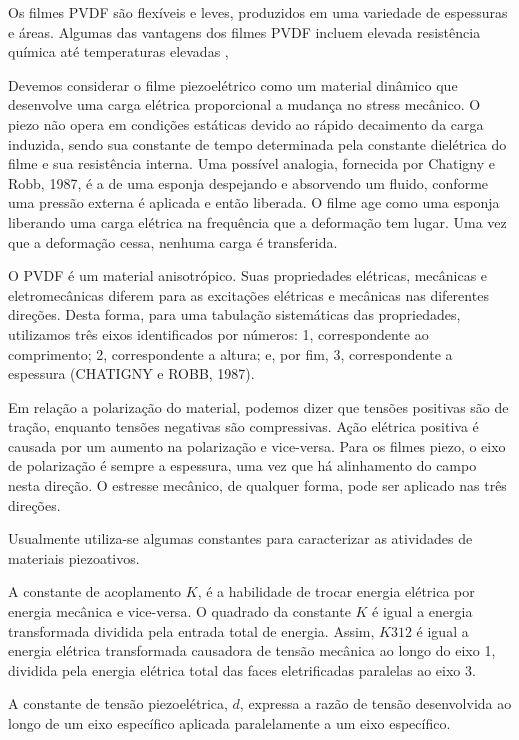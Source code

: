 \documentclass[
	12pt,				
	oneside,			
	a4paper,			
	english,			
	brazil,			
	]{abntex2ppgsi}
\begin{document}
Os filmes PVDF são flexíveis e leves, produzidos em uma variedade de espessuras e áreas. Algumas das vantagens dos filmes PVDF incluem elevada resistência química até temperaturas elevadas , 

Devemos considerar o filme piezoelétrico como um material dinâmico que desenvolve uma carga elétrica proporcional a mudança no stress mecânico. O piezo não opera em condições estáticas devido ao rápido decaimento da carga induzida, sendo sua constante de tempo determinada pela constante dielétrica do filme e sua resistência interna. 	Uma possível analogia, fornecida por Chatigny e Robb, 1987, é a de uma esponja despejando e absorvendo um fluido, conforme uma pressão externa é aplicada e então liberada. O filme age como uma esponja liberando uma carga elétrica na frequência que a deformação tem lugar. Uma vez que a deformação cessa, nenhuma carga é transferida. 

O PVDF é um material anisotrópico.  Suas propriedades elétricas, mecânicas e eletromecânicas diferem para as excitações elétricas e mecânicas nas diferentes direções. Desta forma, para uma tabulação sistemáticas das propriedades, utilizamos três eixos identificados por números: 1, correspondente ao comprimento; 2, correspondente a altura; e, por fim, 3, correspondente a espessura (CHATIGNY e ROBB, 1987). 

Em relação a polarização do material, podemos dizer que tensões positivas são de tração, enquanto tensões negativas são compressivas. Ação elétrica positiva é causada por um aumento na polarização e vice-versa. Para os filmes piezo, o eixo de polarização é sempre a espessura, uma vez que há alinhamento do campo nesta direção. O estresse mecânico, de qualquer forma, pode ser aplicado nas três direções. 

Usualmente utiliza-se algumas constantes para caracterizar as atividades de materiais piezoativos. 

A constante de acoplamento $K$, é a habilidade de trocar energia elétrica por energia mecânica e vice-versa. O quadrado da constante $K$ é igual a energia transformada dividida pela entrada total de energia. Assim, $K312$ é igual a energia elétrica transformada causadora de tensão mecânica ao longo do eixo 1, dividida pela energia elétrica total das faces eletrificadas paralelas ao eixo 3. 

A constante de tensão piezoelétrica, $d$, expressa a razão de tensão desenvolvida ao longo de um eixo específico aplicada paralelamente a um eixo específico. 
\end{document}
